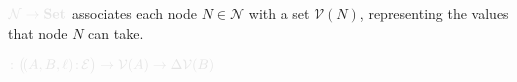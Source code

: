 \documentclass{article}
\newcommand{\notation}[2][]{#1}
\renewcommand{\notation}[2][]{{\color{notationcolor} #2}}
\newcommand{\bmu}{\boldsymbol{\mu}}
\newcommand{\V}{\mathcal V}
\newcommand{\N}{\mathcal N}
\newcommand{\Ed}{\mathcal E}
\newcommand{\MN}{PDG}
\numberwithin{equation}{section}
\begin{document}
\begin{defn}[\MN]
\begin{description}[nosep]
			\item[$\V$] $\notation{\N \to \mathbf{Set}}$ associates each node $N \in \N$ with a set $\V(N)$,
			 representing the values that node $N$ can take. 
			\item[$\bmu$] $\notation{\colon \big(\!({A,B,\ell})\colon \! \Ed \big) \to \V(A) \to \Delta\V(B)}$

\end{description}
\end{defn}
\end{document}
